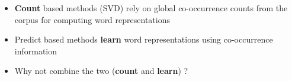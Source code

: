 \begin{frame}
\end{frame}

\begin{frame}
	\begin{itemize}\justifying
		\item<1-> \textbf{Count} based methods (SVD) rely on global co-occurrence counts from the corpus for computing word representations
		\item<2-> Predict based methods \textbf{learn} word representations using co-occurrence information
		\item<3-> Why not combine the two (\textbf{count} and \textbf{learn}) ?
	\end{itemize}
\end{frame}


